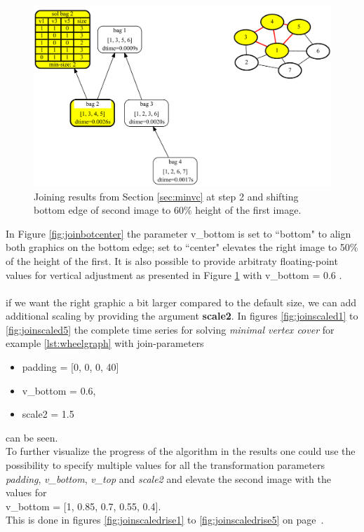 \documentclass[a4paper, 12pt, bibliography=totoc]{scrartcl}
\begin{document}
\begin{figure}[H]
	\centering
	\includegraphics[width=0.9\linewidth,height=0.9\textheight,keepaspectratio]{images/SVGJOIN/default_062.pdf}
	\caption{Joining results from Section \ref{sec:minvc} at step 2 and shifting bottom edge of second image to $60\%$ height of the first image.}
	\label{fig:join60}
\end{figure}

In Figure \ref{fig:joinbotcenter} the parameter v\_bottom is set to ``bottom" to align both graphics on the bottom edge; set to ``center" elevates the right image to 50\% of the height of the first. It is also possible to provide arbitraty floating-point values for vertical adjustment as presented in Figure \ref{fig:join60} with v\_bottom = 0.6 .\\
\\
if we want the right graphic a bit larger compared to the default size, we can add additional scaling by providing the argument \textbf{scale2}. In figures \ref{fig:joinscaled1} to \ref{fig:joinscaled5} the complete time series for solving \textit{minimal vertex cover} for example \ref{lst:wheelgraph} with join-parameters
\begin{itemize}
	\item[] padding = [0, 0, 0, 40]
	\item[] v\_bottom = 0.6,
	\item[] scale2 = 1.5
\end{itemize}
can be seen. \\
To further visualize the progress of the algorithm in the results one could use the possibility to specify multiple values for all the transformation parameters \textit{padding}, \textit{v\_bottom}, \textit{v\_top} and \textit{scale2} and elevate the second image with the values for\\
 v\_bottom = [1, 0.85, 0.7, 0.55, 0.4]. \\
 This is done in figures \ref{fig:joinscaledrise1} to \ref{fig:joinscaledrise5} on page~\pageref{fig:joinscaledrise1}.
\end{document}
